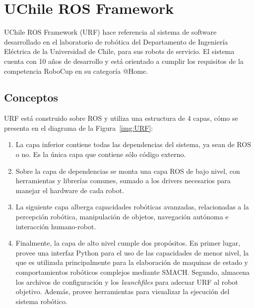
\section{UChile ROS Framework}\label{sec:URF}

UChile ROS Framework (URF) hace referencia al sistema de software desarrollado en el laboratorio de robótica del Departamento de Ingeniería Eléctrica de la Universidad de Chile, para sus robots de servicio. El sistema cuenta con 10 años de desarrollo y está orientado a cumplir los requisitos de la competencia RoboCup en su categoría @Home.

\subsection{Conceptos}

URF está construido sobre ROS y utiliza una estructura de 4 capas, cómo se presenta en el diagrama de la Figura~\ref{img:URF}:
\begin{enumerate}
\item La capa inferior contiene todas las dependencias del sistema, ya sean de ROS o no. Es la única capa que contiene sólo código externo.
\item Sobre la capa de dependencias se monta una capa ROS de bajo nivel, con herramientas y librerías comunes, sumado a los drivers necesarios para manejar el hardware de cada robot.
\item La siguiente capa alberga capacidades robóticas avanzadas, relacionadas a la  percepción robótica, manipulación de objetos, navegación autónoma e interacción humano-robot.
\item Finalmente, la capa de alto nivel cumple dos propósitos. En primer lugar, provee una interfaz Python para el uso de las capacidades de menor nivel, la que es utilizada principalmente para la elaboración de maquinas de estado y comportamientos robóticos complejos mediante SMACH. Segundo, almacena los archivos de configuración y los \textit{launchfiles} para adecuar URF al robot objetivo. Además, provee herramientas para visualizar la ejecución del sistema robótico.
\end{enumerate}

